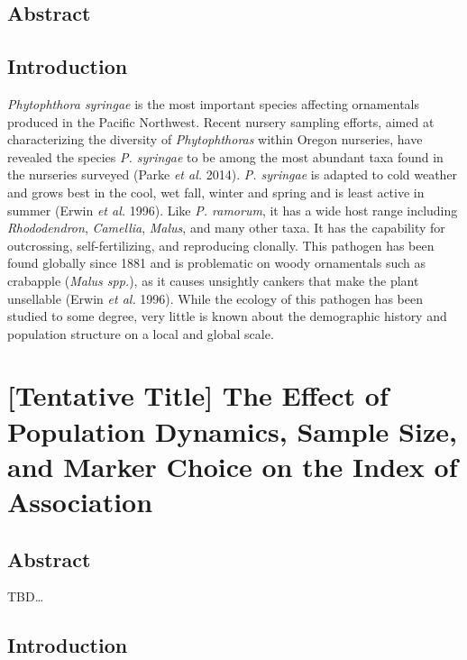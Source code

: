 \documentclass[double,12pt]{beavtex}
\begin{document}
  \section{Abstract}\label{abstract-3}
  
  \section{Introduction}\label{introduction-2}
  
  \emph{Phytophthora syringae} is the most important species affecting
  ornamentals produced in the Pacific Northwest. Recent nursery sampling
  efforts, aimed at characterizing the diversity of \emph{Phytophthoras}
  within Oregon nurseries, have revealed the species \emph{P. syringae} to
  be among the most abundant taxa found in the nurseries surveyed (Parke
  \emph{et al.} 2014). \emph{P. syringae} is adapted to cold weather and
  grows best in the cool, wet fall, winter and spring and is least active
  in summer (Erwin \emph{et al.} 1996). Like \emph{P. ramorum}, it has a
  wide host range including \emph{Rhododendron}, \emph{Camellia},
  \emph{Malus}, and many other taxa. It has the capability for
  outcrossing, self-fertilizing, and reproducing clonally. This pathogen
  has been found globally since 1881 and is problematic on woody
  ornamentals such as crabapple (\emph{Malus spp.}), as it causes
  unsightly cankers that make the plant unsellable (Erwin \emph{et al.}
  1996). While the ecology of this pathogen has been studied to some
  degree, very little is known about the demographic history and
  population structure on a local and global scale.
  
  \chapter{{[}Tentative Title{]} The Effect of Population Dynamics, Sample
  Size, and Marker Choice on the Index of
  Association}\label{tentative-title-the-effect-of-population-dynamics-sample-size-and-marker-choice-on-the-index-of-association}
  
  \section{Abstract}\label{abstract-4}
  
  TBD\ldots{}
  
  \section{Introduction}\label{introduction-3}
  
\end{document}
